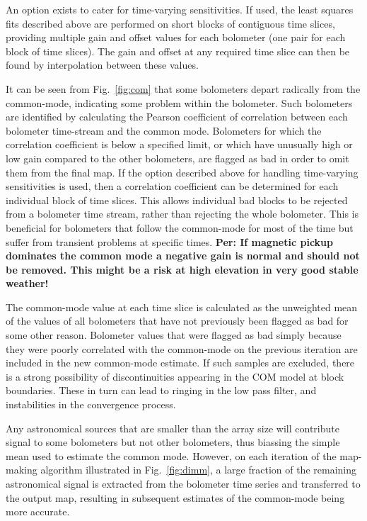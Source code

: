 \documentclass[useAMS,usenatbib,nofootinbib]{mn2e}
\begin{document}
An option exists to cater for time-varying sensitivities. If used, the
least squares fits described above are performed on short blocks of
contiguous time slices, providing multiple gain and offset values for
each bolometer (one pair for each block of time slices). The gain and
offset at any required time slice can then be found by interpolation
between these values.

It can be seen from Fig.~\ref{fig:com} that some bolometers depart
radically from the common-mode, indicating some problem within the
bolometer. Such bolometers are identified by calculating the Pearson
coefficient of correlation between each bolometer time-stream and the
common mode. Bolometers for which the correlation coefficient is below
a specified limit, or which have unusually high or low gain compared to
the other bolometers, are flagged as bad in order to omit them from the
final map. If the option described
above for handling time-varying sensitivities is used, then a
correlation coefficient can be determined for each individual block of
time slices.  This allows individual bad blocks to be rejected from a
bolometer time stream, rather than rejecting the whole bolometer. This
is beneficial for bolometers that follow the common-mode for most of
the time but suffer from transient problems at specific times. {\bf
Per: If magnetic pickup dominates the common mode a negative gain is
normal and should not be removed. This might be a risk at high
elevation in very good stable weather!}

The common-mode value at each time slice is calculated as the unweighted
mean of the values of all bolometers that have not previously been
flagged as bad for some other reason. Bolometer values that were flagged
as bad simply because they were poorly correlated with the common-mode on
the previous iteration are included in the new common-mode estimate. If
such samples are excluded, there is a strong possibility of
discontinuities appearing in the COM model at block boundaries.
These in turn can lead to ringing in the low pass filter, and
instabilities in the convergence process.

Any astronomical sources that are smaller than the array size will
contribute signal to some bolometers but not other bolometers, thus
biassing the simple mean used to estimate the common mode. However, on
each iteration of the map-making algorithm illustrated in
Fig.~\ref{fig:dimm}, a large fraction of the remaining astronomical
signal is extracted from the bolometer time series and transferred to the
output map, resulting in subsequent estimates of the common-mode being
more accurate.
\end{document}
